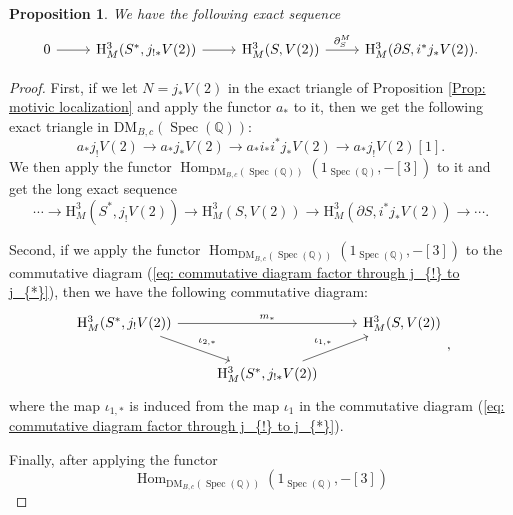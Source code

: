 \documentclass[11pt, a4paper]{amsart}
\theoremstyle{plain}
\newtheorem{proposition}[theorem]{Proposition}
\theoremstyle{definition}
\numberwithin{equation}{section}
\def\QQ{\mathbb{Q}}
\DeclareMathOperator{\Hom}{Hom}
\DeclareMathOperator{\Spec}{Spec}
\begin{document}
\begin{proposition}
We have the following exact sequence 
\[  
    \begin{tikzcd}
        0 \ar[r] & \mathrm{H}_{M}^{3}(S^{*}, j_{!*}V(2)) \ar[r] & \mathrm{H}^{3}_{M}(S,V(2)) \ar[r, "{\partial_{S}^{M}}"] & \mathrm{H}^{3}_{M}(\partial{S}, i^{*}j_{*}V(2)). 
    \end{tikzcd}
\]
\end{proposition}

\begin{proof}
First, if we let $N = j_{*}V(2)$ in the exact triangle of Proposition \ref{Prop: motivic localization} and apply the functor $a_{*}$ to it, then we get the following exact triangle in $\mathrm{DM}_{B, c}(\Spec(\QQ))$: 
\begin{equation*}
    a_{*}j_{!}V(2) \rightarrow a_{*}j_{*}V(2) \rightarrow a_{*}i_{*}i^{*}j_{*}V(2) \rightarrow a_{*}j_{!}V(2)[1].
\end{equation*}
We then apply the functor $\Hom_{\mathrm{DM}_{B, c}(\Spec(\QQ))}(1_{\Spec(\QQ)}, -[3])$ to it and get the long exact sequence
\begin{equation*}
    \cdots \rightarrow \mathrm{H}^{3}_{M}(S^{*},j_{!}V(2))  \rightarrow \mathrm{H}^{3}_{M}(S,V(2)) \rightarrow \mathrm{H}^{3}_{M}(\partial{S}, i^{*}j_{*}V(2)) \rightarrow \cdots. 
\end{equation*}
\par Second, if we apply the functor $\Hom_{\mathrm{DM}_{B, c}(\Spec(\QQ))}(1_{\Spec(\QQ)}, -[3])$ to the commutative diagram (\ref{eq: commutative diagram factor through j_{!} to j_{*}}), then we have the following commutative diagram: 
          \begin{equation}
             \begin{tikzcd}
                 \mathrm{H}^{3}_{M}(S^{*},j_{!}V(2)) \ar[rr, "m_{*}"] \ar[rd, "\iota_{2, *}"]& & \mathrm{H}^{3}_{M}(S,V(2)) \\
                 & \mathrm{H}_{M}^{3}(S^{*}, j_{!*}V(2))  \ar[ru, "\iota_{1, *}"] & 
             \end{tikzcd}, 
          \end{equation}
where the map $\iota_{1, *}$ is induced from the map $\iota_{1}$ in the commutative diagram (\ref{eq: commutative diagram factor through j_{!} to j_{*}}). 
\par Finally, after applying the functor 
\begin{equation*}
    \Hom_{\mathrm{DM}_{B, c}(\Spec(\QQ))}(1_{\Spec(\QQ)}, -[3])
\end{equation*}

\end{proof}
\end{document}
